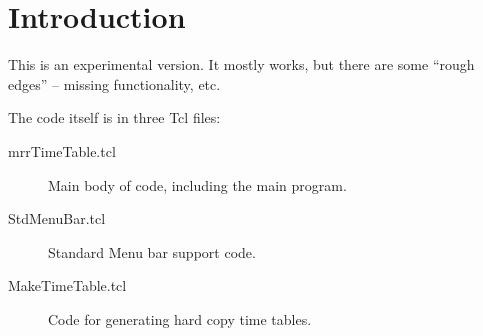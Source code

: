 
\chapter{Introduction}
\label{chapt:Introduction}

This is an experimental version.  It mostly works, but there are some
``rough edges'' -- missing functionality, etc.

The code itself is in three Tcl files:

\begin{description}

\item[mrrTimeTable.tcl] Main body of code, including the main program.
\item[StdMenuBar.tcl] Standard Menu bar support code.
\item[MakeTimeTable.tcl] Code for generating hard copy time tables.

\end{description}

